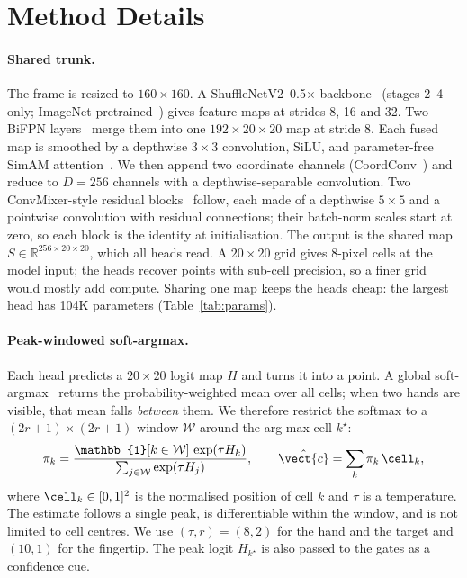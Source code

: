 \section{Method Details}\label{app:method}

\paragraph{Shared trunk.} The frame is resized to $160\times160$. A ShuffleNetV2~0.5$\times$ backbone~\cite{ma2018shufflenet} (stages 2--4 only; ImageNet-pretrained~\cite{deng2009imagenet}) gives feature maps at strides 8, 16 and 32. Two BiFPN layers~\cite{tan2020efficientdet} merge them into one $192\times20\times20$ map at stride 8. Each fused map is smoothed by a depthwise $3\times3$ convolution, SiLU, and parameter-free SimAM attention~\cite{yang2021simam}. We then append two coordinate channels (CoordConv~\cite{liu2018coordconv}) and reduce to $D{=}256$ channels with a depthwise-separable convolution. Two ConvMixer-style residual blocks~\cite{trockman2023patches} follow, each made of a depthwise $5\times5$ and a pointwise convolution with residual connections; their batch-norm scales start at zero, so each block is the identity at initialisation. The output is the shared map $S\in\mathbb{R}^{256\times20\times20}$, which all heads read. A $20\times20$ grid gives 8-pixel cells at the model input; the heads recover points with sub-cell precision, so a finer grid would mostly add compute. Sharing one map keeps the heads cheap: the largest head has 104K parameters (Table~\ref{tab:params}).

\paragraph{Peak-windowed soft-argmax.} Each head predicts a $20\times20$ logit map $H$ and turns it into a point. A global soft-argmax~\cite{sun2018integral} returns the probability-weighted mean over all cells; when two hands are visible, that mean falls \emph{between} them. We therefore restrict the softmax to a $(2r{+}1)\times(2r{+}1)$ window $\mathcal{W}$ around the arg-max cell $k^\star$:
\begin{equation}
\pi_k=\frac{\mathbb{1}[k\in\mathcal{W}]\,\exp(\tau H_k)}{\sum_{j\in\mathcal{W}}\exp(\tau H_j)},\qquad
\hat{\vect{c}}=\sum_k \pi_k\,\cell_k ,
\label{eq:softargmax}
\end{equation}
where $\cell_k\in[0,1]^2$ is the normalised position of cell $k$ and $\tau$ is a temperature. The estimate follows a single peak, is differentiable within the window, and is not limited to cell centres. We use $(\tau,r)=(8,2)$ for the hand and the target and $(10,1)$ for the fingertip. The peak logit $H_{k^\star}$ is also passed to the gates as a confidence cue.

